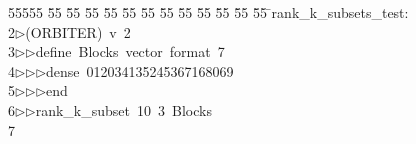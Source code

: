 %
%
\begin{tabbing}
55555 \= 55 \= 55 \= 55 \= 55 \= 55 \= 55 \= 55 \= 55 \= 55 \= 55 \= 55 \= 55 \= \>rank\_k\_subsets\_test:\\[0pt]
2\>$\triangleright$\>(ORBITER)\ v\ 2\ \\[0pt]
3\>$\triangleright$\>$\triangleright$\>define\ Blocks\ vector\ format\ 7\ \\[0pt]
4\>$\triangleright$\>$\triangleright$\>$\triangleright$\>dense\ 012034135245367168069\ \\[0pt]
5\>$\triangleright$\>$\triangleright$\>$\triangleright$\>end\ \\[0pt]
6\>$\triangleright$\>$\triangleright$\>rank\_k\_subset\ 10\ 3\ Blocks\\[0pt]
7\>\end{tabbing}
